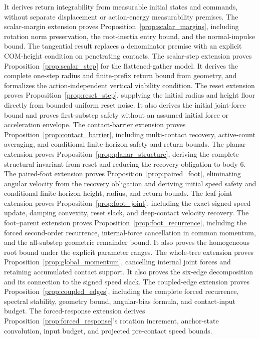 It derives return integrability from measurable initial states and commands, without separate displacement or action-energy measurability premises.
The scalar-margin extension proves Proposition~\ref{prop:scalar_margins}, including rotation norm preservation, the root-inertia entry bound, and the normal-impulse bound.
The tangential result replaces a denominator premise with an explicit COM-height condition on penetrating contacts.
The scalar-step extension proves Proposition~\ref{prop:scalar_step} for the flattened-gather model.
It derives the complete one-step radius and finite-prefix return bound from geometry, and formalizes the action-independent vertical viability condition.
The reset extension proves Proposition~\ref{prop:reset_step}, supplying the initial radius and height floor directly from bounded uniform reset noise.
It also derives the initial joint-force bound and proves first-substep safety without an assumed initial force or acceleration envelope.
The contact-barrier extension proves Proposition~\ref{prop:contact_barrier}, including multi-contact recovery, active-count averaging, and conditional finite-horizon safety and return bounds.
The planar extension proves Proposition~\ref{prop:planar_structure}, deriving the complete structural invariant from reset and reducing the recovery obligation to body $6$.
The paired-foot extension proves Proposition~\ref{prop:paired_foot}, eliminating angular velocity from the recovery obligation and deriving initial speed safety and conditional finite-horizon height, radius, and return bounds.
The leaf-joint extension proves Proposition~\ref{prop:foot_joint}, including the exact signed speed update, damping convexity, reset slack, and deep-contact velocity recovery.
The foot--parent extension proves Proposition~\ref{prop:foot_recurrence}, including the forced second-order recurrence, internal-force cancellation in common momentum, and the all-substep geometric remainder bound.
It also proves the homogeneous root bound under the explicit parameter ranges.
The whole-tree extension proves Proposition~\ref{prop:global_momentum}, cancelling internal joint forces and retaining accumulated contact support.
It also proves the six-edge decomposition and its connection to the signed speed slack.
The coupled-edge extension proves Proposition~\ref{prop:coupled_edges}, including the complete forced recurrence, spectral stability, geometry bound, angular-bias formula, and contact-input budget.
The forced-response extension derives Proposition~\ref{prop:forced_response}'s rotation increment, anchor-state convolution, input budget, and projected pre-contact speed bounds.
